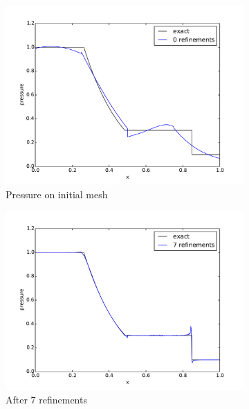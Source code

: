 \documentclass[preprint,12pt]{elsarticle}
\begin{document}
\begin{figure}[p]
\begin{subfigure}[c]{0.3\textwidth}
\includegraphics[width=\textwidth]{SpaceTimeCNS/Sod1e-5/pres1.pdf}
\caption{Pressure on initial mesh}
\label{fig:sod_pres0}
\end{subfigure}
\begin{subfigure}[c]{0.3\textwidth}
\centering
\includegraphics[width=\textwidth]{SpaceTimeCNS/Sod1e-5/pres8.pdf}
\caption{After 7 refinements}
\label{fig:sod_pres7}
\end{subfigure}
\begin{subfigure}[c]{0.3\textwidth}
\centering

\end{subfigure}
\end{figure}
\end{document}
